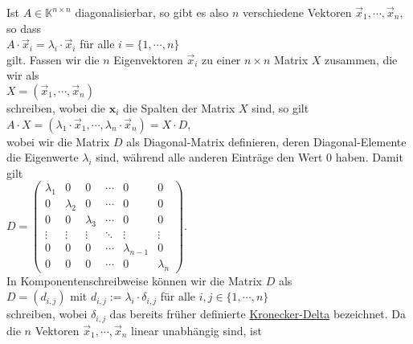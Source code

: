 \remark
Ist  $A \in \mathbb{K}^{n \times n}$ diagonalisierbar, so gibt es also $n$ verschiedene Vektoren
$\vec{x}_1, \cdots, \vec{x}_n$, so dass
\\[0.2cm]
\hspace*{1.3cm}
$A \cdot \vec{x}_i = \lambda_i \cdot \vec{x}_i$ \quad f\"ur alle $i=\{1,\cdots,n\}$
\\[0.2cm]
gilt. Fassen wir die $n$ Eigenvektoren $\vec{x}_i$ zu einer $n \times n$ Matrix $X$ zusammen, die
wir als
\\[0.2cm]
\hspace*{1.3cm}
$X = (\vec{x}_1, \cdots, \vec{x}_n)$
\\[0.2cm]
schreiben, wobei die $\textbf{x}_i$ die Spalten der Matrix $X$ sind, so gilt
\\[0.2cm]
\hspace*{1.3cm}
$A \cdot X = (\lambda_1 \cdot \vec{x}_1, \cdots, \lambda_n \cdot \vec{x}_n) = X \cdot D$,
\\[0.2cm]
wobei wir die Matrix $D$ als Diagonal-Matrix definieren, deren Diagonal-Elemente die Eigenwerte
$\lambda_i$ sind, w\"ahrend alle anderen Eintr\"age den Wert $0$ haben.  Damit gilt 
\\[0.2cm]
\hspace*{1.3cm}
$D = \left(
  \begin{array}{llllll}
    \lambda_1 & 0         & 0         & \cdots & 0 & 0 \\ 
    0         & \lambda_2 & 0         & \cdots & 0 & 0 \\
    0         & 0         & \lambda_3 & \cdots & 0 & 0 \\
    \vdots    & \vdots    & \vdots    & \ddots & \vdots & \vdots \\
    0         & 0         & 0         & \cdots  & \lambda_{n-1} & 0 \\
    0         & 0         & 0         & \cdots & 0 & \lambda_n 
  \end{array}
\right)
$.
\\[0.2cm]
In Komponentenschreibweise k\"onnen wir die Matrix $D$ als
\\[0.2cm]
\hspace*{1.3cm}
$D = (d_{i,j})$ \quad mit $d_{i,j} := \lambda_i \cdot \delta_{i,j}$ \quad f\"ur alle $i,j\in \{1,\cdots,n\}$
\\[0.2cm]
schreiben, wobei $\delta_{i,j}$ das bereits fr\"uher definierte
\href{http://de.wikipedia.org/wiki/Kronecker-Delta}{Kronecker-Delta} bezeichnet.  Da die $n$
Vektoren $\vec{ x}_1, \cdots, \vec{x}_n$ linear unabh\"angig sind, ist 
